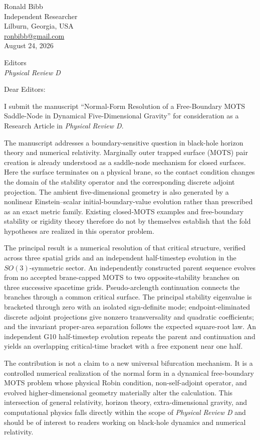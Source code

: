 \documentclass[11pt]{article}
\begin{document}
\begin{flushright}
Ronald Bibb\\
Independent Researcher\\
Lilburn, Georgia, USA\\
\href{mailto:ronbibb@gmail.com}{ronbibb@gmail.com}\\[0.75em]
August 24, 2026
\end{flushright}

Editors\\
\textit{Physical Review D}

Dear Editors:

I submit the manuscript ``Normal-Form Resolution of a Free-Boundary MOTS
Saddle-Node in Dynamical Five-Dimensional Gravity'' for consideration as a
Research Article in \textit{Physical Review D}.

The manuscript addresses a boundary-sensitive question in black-hole horizon
theory and numerical relativity.  Marginally outer trapped surface (MOTS) pair
creation is already understood as a saddle-node mechanism for closed surfaces.
Here the surface terminates on a physical brane, so the contact condition
changes the domain of the stability operator and the corresponding discrete
adjoint projection.  The ambient five-dimensional geometry is also generated
by a nonlinear Einstein--scalar initial-boundary-value evolution rather than
prescribed as an exact metric family.  Existing closed-MOTS examples and
free-boundary stability or rigidity theory therefore do not by themselves
establish that the fold hypotheses are realized in this operator problem.

The principal result is a numerical resolution of that critical structure,
verified across three spatial grids and an independent half-timestep evolution
in the $SO(3)$-symmetric sector.  An independently
constructed parent sequence evolves from no accepted brane-capped MOTS to two
opposite-stability branches on three successive spacetime grids.
Pseudo-arclength continuation connects the branches through a common critical
surface.  The principal stability eigenvalue is bracketed through zero with an
isolated sign-definite mode; endpoint-eliminated discrete adjoint projections
give nonzero transversality and quadratic coefficients; and the invariant
proper-area separation follows the expected square-root law.  An independent
G10 half-timestep evolution repeats the parent and continuation and yields an
overlapping critical-time bracket with a free exponent near one half.

The contribution is not a claim to a new universal bifurcation mechanism.  It
is a controlled numerical realization of the normal form in a dynamical
free-boundary MOTS problem whose physical Robin condition, non-self-adjoint
operator, and evolved higher-dimensional geometry materially alter the
calculation.  This intersection of general relativity, horizon theory,
extra-dimensional gravity, and computational physics falls directly within
the scope of \textit{Physical Review D} and should be of interest to readers
working on black-hole dynamics and numerical relativity.
\end{document}
